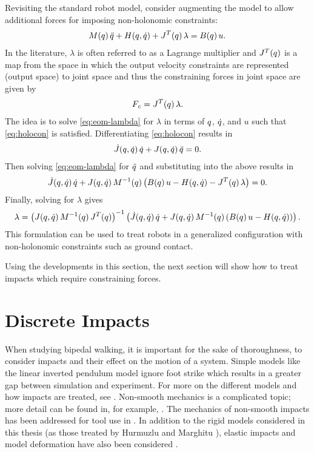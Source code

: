 Revisiting the standard robot model, consider augmenting the model to allow
additional forces for imposing non-holonomic constraints:
%
\begin{align}
  \label{eq:eom-lambda}
  M(q) \, \ddot{q} + H(q, \dot{q}) + J^{T}(q) \, \lambda = B(q) \, u.
\end{align}
%
In the literature, $\lambda$ is often referred to as a Lagrange multiplier
\cite[\S 4.10]{Baruh1998} and $J^{T}(q)$ is a map from the space in which
the output velocity constraints are represented (output space) to joint space
and thus the constraining forces in joint space are given by
%
\begin{align*}
  F_{\mathit{c}} = J^{T}(q) \, \lambda.
\end{align*}
The idea is to solve \eqref{eq:eom-lambda} for $\lambda$ in terms of $q$,
$\dot{q}$, and $u$ such that \eqref{eq:holocon} is satisfied.
%
Differentiating \eqref{eq:holocon} results in
\begin{align*}
 {\dot {J}}(q, \dot{q}) \, \dot{q} + J(q, \dot{q}) \, \ddot{q} = 0.
\end{align*}
%
Then solving \eqref{eq:eom-lambda} for $\ddot{q}$ and substituting into the above
results in
\begin{align*}
  {\dot {J}}(q, \dot{q}) \, \dot{q} + J(q, \dot{q}) \, M^{-1}(q) \left(B(q) \, u
    -H(q, \dot{q}) - J^{T}(q) \, \lambda \right) = 0.
\end{align*}
Finally, solving for $\lambda$ gives
\begin{align*}
   \lambda = \left( J(q, \dot{q}) \, M^{-1}(q) \, J^{T}(q) \right)^{-1}
   \left( {\dot {J}}(q, \dot{q}) \, \dot{q} + J(q, \dot{q}) \, M^{-1}(q) \left(B(q) \, u
    -H(q, \dot{q})\right) \right).
\end{align*}
%
This formulation can be used to treat robots in a generalized configuration
with non-holonomic constraints such as ground contact.

Using the developments in this section, the next section will show how to treat
impacts which require constraining forces.

\section{Discrete Impacts}

When studying bipedal walking, it is important for the sake of thoroughness, to
consider impacts and their effect on the motion of a system.
%
Simple models like the linear inverted pendulum model ignore foot strike which
results in a greater gap between simulation and experiment.
%
For more on the different models and how impacts are treated, see
.
%
Non-smooth mechanics is a complicated topic; more detail can be found in, for
example, \cite{Brogliato1996, Kozlov1991}.
%
The mechanics of non-smooth impacts has been addressed for tool use in
\cite{Gorinevsky1997, Siciliano1999}.
%
In addition to the rigid models considered in this thesis (as those treated by
Hurmuzlu and Marghitu \cite{Hurmuzlu1994}), elastic impacts and model
deformation have also been considered \cite{Chapnik1991, Wei1993}.

